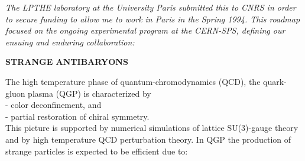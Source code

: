 \noindent \textit{The LPTHE laboratory at the University Paris submitted this to CNRS in order to secure funding to allow me to work in Paris in the Spring 1994. This roadmap focused on the ongoing experimental program at the CERN-SPS, defining our ensuing and enduring collaboration:\/}\\[-0.7cm]
% 
\begin{mdframed}[linecolor=gray,roundcorner=12pt,backgroundcolor=Dandelion!15,linewidth=1pt,leftmargin=0cm,rightmargin=0cm,topline=true,bottomline=true,skipabove=12pt]\relax%
%
\small
\begin{center}
\textbf{STRANGE ANTIBARYONS}
\end{center}

The high temperature phase of quantum-chromodynamics (QCD), the quark-gluon plasma (QGP) is characterized by\\ 
- color deconfinement, and\\ 
- partial restoration of chiral symmetry.\\ 
This picture is supported by numerical simulations of lattice SU(3)-gauge theory and by high temperature QCD perturbation theory. In QGP the production of strange particles is expected to be efficient due to:\\[-0.6cm] 


\end{mdframed}
